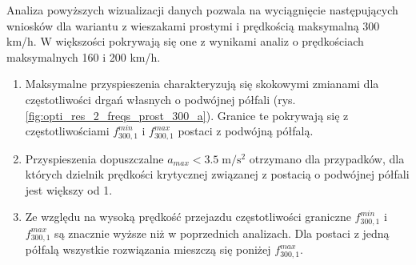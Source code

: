 Analiza powyższych wizualizacji danych pozwala na wyciągnięcie następujących wniosków dla wariantu z wieszakami prostymi i prędkością maksymalną 300 km/h. W większości pokrywają się one z wynikami analiz o prędkościach maksymalnych 160 i 200 km/h.
\begin{enumerate}
	\item Maksymalne przyspieszenia charakteryzują się skokowymi zmianami dla częstotliwości drgań własnych o podwójnej półfali (rys. \ref{fig:opti_res_2_freqs_prost_300_a}). Granice te pokrywają się z częstotliwościami $f_{300,1}^{min}$ i $f_{300,1}^{max}$ postaci z podwójną półfalą. 
	
	\item Przyspieszenia dopuszczalne $a_{max}<3.5\;\mathrm{m/s^2}$ otrzymano dla przypadków, dla których dzielnik prędkości krytycznej związanej z postacią o podwójnej półfali jest większy od 1.
	
	\item Ze względu na wysoką prędkość przejazdu częstotliwości graniczne $f_{300,1}^{min}$ i $f_{300,1}^{max}$ są znacznie wyższe niż w poprzednich analizach. Dla postaci z jedną półfalą wszystkie rozwiązania mieszczą się poniżej $f_{300,1}^{max}$.
\end{enumerate}
\vfill



